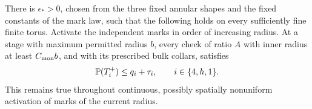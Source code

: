 \begin{proposition}
\label{prop:stability-bootstrap}
There is $\epsilon_*>0$, chosen from the three fixed annular
shapes and the fixed constants of the mark law, such that the
following holds on every sufficiently fine finite torus.
Activate the independent marks in order of increasing radius.
At a stage with maximum permitted radius $b$, every check of
ratio $A$ with inner radius at least $C_{\rm mon}b$, and with its
prescribed bulk collars, satisfies
\begin{equation}
 \P(T_i^+)\leq q_i+\tau_i,
 \qquad i\in\{4,h,1\}.
 \label{eq:stability-bootstrapped}
\end{equation}
This remains true throughout continuous, possibly spatially
nonuniform activation of marks of the current radius.
\end{proposition}

